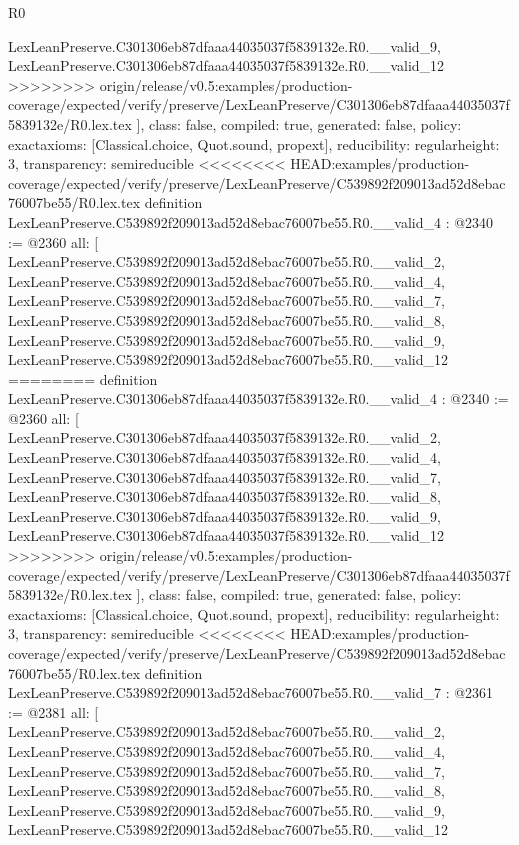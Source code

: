 \begin{lexlean}{R0}
\begin{coremodule}
{{{{{{{{{{{{{{{{{{{{{{{{{{{{{{{{{{{{{{{{{{{{{    LexLeanPreserve.C301306eb87dfaaa44035037f5839132e.R0.__valid_9,
    LexLeanPreserve.C301306eb87dfaaa44035037f5839132e.R0.__valid_12
>>>>>>>> origin/release/v0.5:examples/production-coverage/expected/verify/preserve/LexLeanPreserve/C301306eb87dfaaa44035037f5839132e/R0.lex.tex
  ],
  class: false,
  compiled: true,
  generated: false,
  policy: exact{axioms: [Classical.choice, Quot.sound, propext]},
  reducibility: regular{height: 3},
  transparency: semireducible
}
<<<<<<<< HEAD:examples/production-coverage/expected/verify/preserve/LexLeanPreserve/C539892f209013ad52d8ebac76007be55/R0.lex.tex
definition LexLeanPreserve.C539892f209013ad52d8ebac76007be55.R0.__valid_4 : @2340 := @2360 {
  all: [
    LexLeanPreserve.C539892f209013ad52d8ebac76007be55.R0.__valid_2,
    LexLeanPreserve.C539892f209013ad52d8ebac76007be55.R0.__valid_4,
    LexLeanPreserve.C539892f209013ad52d8ebac76007be55.R0.__valid_7,
    LexLeanPreserve.C539892f209013ad52d8ebac76007be55.R0.__valid_8,
    LexLeanPreserve.C539892f209013ad52d8ebac76007be55.R0.__valid_9,
    LexLeanPreserve.C539892f209013ad52d8ebac76007be55.R0.__valid_12
========
definition LexLeanPreserve.C301306eb87dfaaa44035037f5839132e.R0.__valid_4 : @2340 := @2360 {
  all: [
    LexLeanPreserve.C301306eb87dfaaa44035037f5839132e.R0.__valid_2,
    LexLeanPreserve.C301306eb87dfaaa44035037f5839132e.R0.__valid_4,
    LexLeanPreserve.C301306eb87dfaaa44035037f5839132e.R0.__valid_7,
    LexLeanPreserve.C301306eb87dfaaa44035037f5839132e.R0.__valid_8,
    LexLeanPreserve.C301306eb87dfaaa44035037f5839132e.R0.__valid_9,
    LexLeanPreserve.C301306eb87dfaaa44035037f5839132e.R0.__valid_12
>>>>>>>> origin/release/v0.5:examples/production-coverage/expected/verify/preserve/LexLeanPreserve/C301306eb87dfaaa44035037f5839132e/R0.lex.tex
  ],
  class: false,
  compiled: true,
  generated: false,
  policy: exact{axioms: [Classical.choice, Quot.sound, propext]},
  reducibility: regular{height: 3},
  transparency: semireducible
}
<<<<<<<< HEAD:examples/production-coverage/expected/verify/preserve/LexLeanPreserve/C539892f209013ad52d8ebac76007be55/R0.lex.tex
definition LexLeanPreserve.C539892f209013ad52d8ebac76007be55.R0.__valid_7 : @2361 := @2381 {
  all: [
    LexLeanPreserve.C539892f209013ad52d8ebac76007be55.R0.__valid_2,
    LexLeanPreserve.C539892f209013ad52d8ebac76007be55.R0.__valid_4,
    LexLeanPreserve.C539892f209013ad52d8ebac76007be55.R0.__valid_7,
    LexLeanPreserve.C539892f209013ad52d8ebac76007be55.R0.__valid_8,
    LexLeanPreserve.C539892f209013ad52d8ebac76007be55.R0.__valid_9,
    LexLeanPreserve.C539892f209013ad52d8ebac76007be55.R0.__valid_12
}}}}}}}}}}}}}}}}}}}}}}}}}}}}}}}}}}}}}}}}}}}}}}
\end{coremodule}
\end{lexlean}
